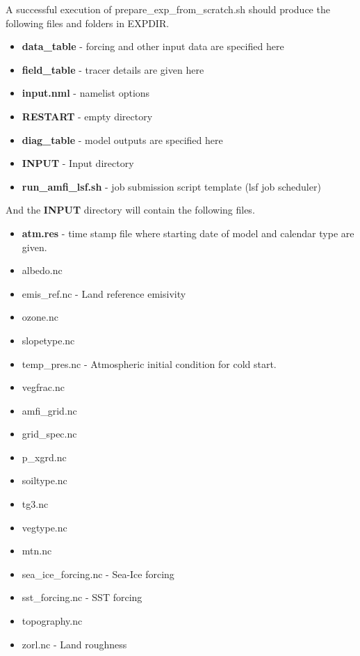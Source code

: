 \documentclass{article}
\begin{document}
A successful execution of prepare\_exp\_from\_scratch.sh should produce the following files and folders in EXPDIR.

\begin{itemize}
    \item \textbf{data\_table} - forcing and other input data are specified here
    \item \textbf{field\_table} - tracer details are given here
    \item \textbf{input.nml} - namelist options
    \item \textbf{RESTART} - empty directory
    \item \textbf{diag\_table} - model outputs are specified here
    \item \textbf{INPUT} - Input directory
    \item \textbf{run\_amfi\_lsf.sh} - job submission script template (lsf job scheduler)
\end{itemize}
And the \textbf{INPUT} directory will contain the following files.
\begin{itemize}
    \item \textbf{atm.res} - time stamp file where starting date of model and calendar type are given.
    \item albedo.nc 
    \item emis\_ref.nc - Land reference emisivity 
    \item ozone.nc           
    \item slopetype.nc    
    \item temp\_pres.nc - Atmospheric initial condition for cold start.
    \item vegfrac.nc
    \item amfi\_grid.nc
    \item grid\_spec.nc  
    \item p\_xgrd.nc           
    \item soiltype.nc   
    \item tg3.nc         
    \item vegtype.nc
    \item mtn.nc
    \item sea\_ice\_forcing.nc - Sea-Ice forcing 
    \item sst\_forcing.nc - SST forcing
    \item topography.nc
    \item zorl.nc - Land roughness
\end{itemize}
\end{document}

